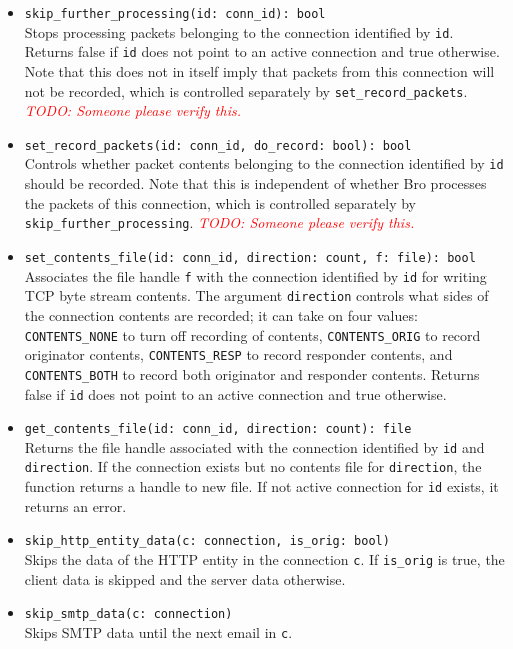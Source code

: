 \documentclass[10pt,landscape]{article}
\def\todo#1{\textit{\textcolor{red}{TODO: #1}}}
\begin{document}
\begin{multicols*}{2}
\begin{itemize}
  \item \verb|skip_further_processing(id: conn_id): bool|\\
    Stops processing packets belonging to the connection identified by
    \texttt{id}.
    Returns false if \texttt{id} does not point to an active connection and
    true otherwise.
    Note that this does not in itself imply that packets from this connection
    will not be recorded, which is controlled separately by
    \verb|set_record_packets|.
    \todo{Someone please verify this.}
  \item \verb|set_record_packets(id: conn_id, do_record: bool): bool|\\
    Controls whether packet contents belonging to the connection identified by
    \texttt{id} should be recorded.
    Note that this is independent of whether Bro processes the packets of this
    connection, which is controlled separately by
    \verb|skip_further_processing|.
    \todo{Someone please verify this.}
  \item \verb|set_contents_file(id: conn_id, direction: count, f: file): bool|\\
    Associates the file handle \texttt{f} with the connection identified by
    \texttt{id} for writing TCP byte stream contents. The argument
    \texttt{direction} controls what sides of the connection contents are
    recorded; it can take on four values:
    \verb|CONTENTS_NONE| to turn off recording of contents,
    \verb|CONTENTS_ORIG| to record originator contents,
    \verb|CONTENTS_RESP| to record responder contents,
    and \verb|CONTENTS_BOTH| to record both originator and responder contents.
    Returns false if \texttt{id} does not point to an active connection and
    true otherwise.
  \item \verb|get_contents_file(id: conn_id, direction: count): file|\\
    Returns the file handle associated with the connection identified by
    \texttt{id} and \texttt{direction}. If the connection exists but no
    contents file for \texttt{direction}, the function returns a handle to new
    file. If not active connection for \texttt{id} exists, it returns an error.
  \item \verb|skip_http_entity_data(c: connection, is_orig: bool)|\\
    Skips the data of the HTTP entity in the connection \texttt{c}. If
    \verb|is_orig| is true, the client data is skipped and the server data
    otherwise.
  \item \verb|skip_smtp_data(c: connection)|\\
    Skips SMTP data until the next email in \texttt{c}.
\end{itemize}


\end{multicols*}
\end{document}
